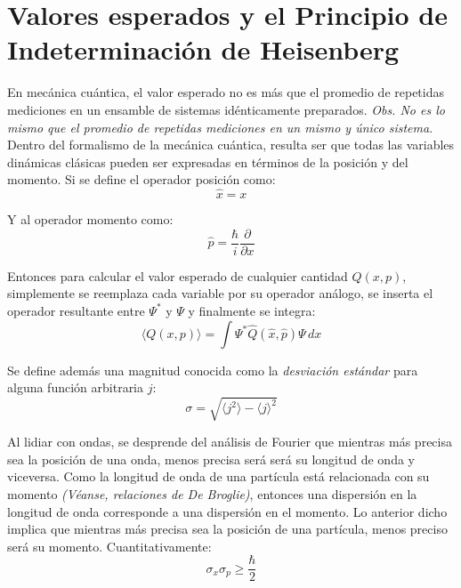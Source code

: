 \section{Valores esperados y el Principio de Indeterminación de Heisenberg}
\label{Valores esperados y el Principio de Indeterminación de Heisenberg}

En mecánica cuántica, el valor esperado no es más que el promedio de repetidas mediciones en un ensamble de sistemas 
idénticamente preparados. \emph{Obs. No es lo mismo que el promedio de repetidas mediciones en un mismo y 
único sistema}. \\
Dentro del formalismo de la mecánica cuántica, resulta ser que todas las variables dinámicas clásicas pueden ser expresadas 
en términos de la posición y del momento. Si se define el operador posición como:
\begin{equation}
    \hat{x} = x
\end{equation}

Y al operador momento como:
\begin{equation}
    \hat{p} = \frac{\hbar}{i} \frac{\partial}{\partial x}
\end{equation}

Entonces para calcular el valor esperado de cualquier cantidad $Q(x,p)$, simplemente se reemplaza cada variable por su 
operador análogo, se inserta el operador resultante entre $\Psi^*$ y $\Psi$ y finalmente se integra:
\begin{equation}
    \langle Q(x,p) \rangle = \int \Psi^* \hat{Q}(\hat{x},\hat{p}) \Psi \, dx
\end{equation}

Se define además una magnitud conocida como la \emph{desviación estándar} para alguna función arbitraria $j$:
\begin{equation}
    \sigma = \sqrt{\langle j^2 \rangle - \langle j \rangle^2}
\end{equation}

Al lidiar con ondas, se desprende del análisis de Fourier que mientras más precisa sea la posición de una onda, menos 
precisa será será su longitud de onda y viceversa. Como la longitud de onda de una partícula está relacionada con su 
momento \emph{(Véanse, relaciones de De Broglie)}, entonces una dispersión en la longitud de onda corresponde a una 
dispersión en el momento. Lo anterior dicho implica que mientras más precisa sea la posición de una partícula, menos preciso 
será su momento. Cuantitativamente:
\begin{equation}
    \sigma_{x} \sigma_{p} \geq \frac{\hbar}{2}
\end{equation}

